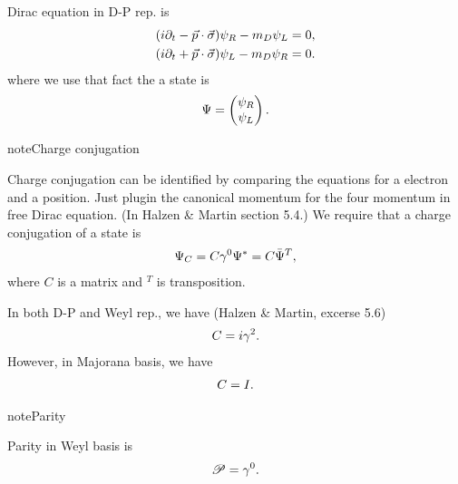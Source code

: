 \documentclass[letterpaper,12pt,english]{sphinxmanual}
\begin{document}
Dirac equation in D-P rep. is
\begin{gather}
\begin{split}(i\partial_t - \vec p \cdot \vec \sigma) \psi_R - m_D\psi_L &= 0, \\
(i\partial_t + \vec p \cdot \vec \sigma) \psi_L - m_D\psi_R &= 0.\end{split}\notag
\end{gather}
where we use that fact the a state is
\begin{gather}
\begin{split}\Psi = \begin{pmatrix}  \psi_R \\ \psi_L \end{pmatrix}.\end{split}\notag
\end{gather}
\begin{notice}{note}{Charge conjugation}

Charge conjugation can be identified by comparing the equations for a electron and a position. Just plugin the canonical momentum for the four momentum in free Dirac equation. (In Halzen \& Martin section 5.4.) We require that a charge conjugation of a state is
\begin{gather}
\begin{split}\Psi_C = C\gamma^0\Psi^* = C \bar\Psi^T,\end{split}\notag
\end{gather}
where \(C\) is a matrix and \({}^T\) is transposition.

In both D-P and Weyl rep., we have (Halzen \& Martin, excerse 5.6)
\begin{gather}
\begin{split}C = i\gamma^2.\end{split}\notag
\end{gather}
However, in Majorana basis, we have
\begin{gather}
\begin{split}C = I.\end{split}\notag
\end{gather}\end{notice}

\begin{notice}{note}{Parity}

Parity in Weyl basis is
\begin{gather}
\begin{split}\mathscr{P} = \gamma^0.\end{split}\notag
\end{gather}\end{notice}
\end{document}
